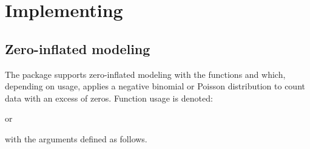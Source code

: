\documentclass[article]{jss}
\begin{document}
\section[Implementing hurdlr]{Implementing }

\subsection{Zero-inflated modeling}

The  package supports zero-inflated modeling with the functions  and  which, depending on usage, applies a negative binomial or Poisson distribution to count data with an excess of zeros. Function usage is denoted:


or


with the arguments defined as follows.
\end{document}
